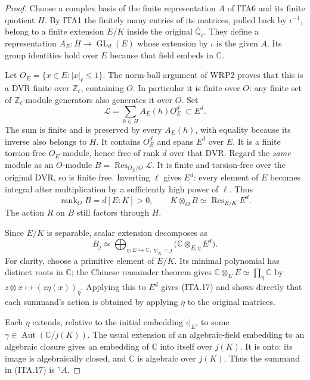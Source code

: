 \documentclass[11pt,a4paper]{article}
\numberwithin{equation}{section}
\theoremstyle{remark}\newtheorem{remark}[theorem]{Remark}
\begin{document}
\begin{proof}
Choose a complex basis of the finite representation $A$ of
ITA6 and its finite quotient $H$.  By ITA1 the finitely
many entries of its matrices, pulled back by $\iota^{-1}$,
belong to a finite extension $E/K$ inside the original
$\overline{\mathbb Q}_\ell$.  They define a representation
$A_E:H\to\operatorname{GL}_d(E)$ whose extension by
$\iota$ is the given $A$.  Its group identities hold over
$E$ because that field embeds in $\mathbb C$.

Let $O_E=\{x\in E:|x|_\ell\leq1\}$.  The norm-ball
argument of WRP2 proves that this is a DVR finite over
$\mathbb Z_\ell$, containing $O$.  In particular it is
finite over $O$: any finite set of $\mathbb Z_\ell$-module
generators also generates it over $O$.  Set
\[
                      \mathcal L=\sum_{h\in H}A_E(h)O_E^d
                                      \ \subset E^d.          \tag{ITA.15}
\]
The sum is finite and is preserved by every $A_E(h)$,
with equality because its inverse also belongs to $H$.
It contains $O_E^d$ and spans $E^d$ over $E$.
It is a finite torsion-free $O_E$-module, hence free of
rank $d$ over that DVR.  Regard the \emph{same} module as
an $O$-module $B=\operatorname{Res}_{O_E/O}\mathcal L$.
It is finite and torsion-free over the original DVR,
so is finite free.  Inverting $\ell$ gives $E^d$:
every element of $E$ becomes integral after multiplication
by a sufficiently high power of $\ell$.  Thus
\[
              \operatorname{rank}_O B=d[E:K]>0,
       \qquad K\otimes_O B\simeq\operatorname{Res}_{E/K}E^d.
                                                               \tag{ITA.16}
\]
The action $R$ on $B$ still factors through $H$.

Since $E/K$ is separable, scalar extension decomposes as
\[
 B_j\simeq
 \bigoplus_{\eta:E\hookrightarrow\mathbb C,\ \eta|_K=j}
                  \bigl(\mathbb C\otimes_{E,\eta}E^d\bigr).
                                                               \tag{ITA.17}
\]
For clarity, choose a primitive element of $E/K$.
Its minimal polynomial has distinct roots in $\mathbb C$;
the Chinese remainder theorem gives
$\mathbb C\otimes_K E\simeq\prod_\eta\mathbb C$
by $z\otimes x\mapsto(z\eta(x))_\eta$.  Applying this
to $E^d$ gives (ITA.17) and shows directly that each
summand's action is obtained by applying $\eta$ to the
original matrices.

Each $\eta$ extends, relative to the initial embedding
$\iota|_E$, to some $\gamma\in
\operatorname{Aut}(\mathbb C/j(K))$.  The usual extension
of an algebraic-field embedding to an algebraic closure
gives an embedding of $\mathbb C$ into itself over
$j(K)$.  It is onto: its image is algebraically closed,
and $\mathbb C$ is algebraic over $j(K)$.  Thus the
summand in (ITA.17) is ${}^{\gamma}A$.


\end{proof}
\end{document}
